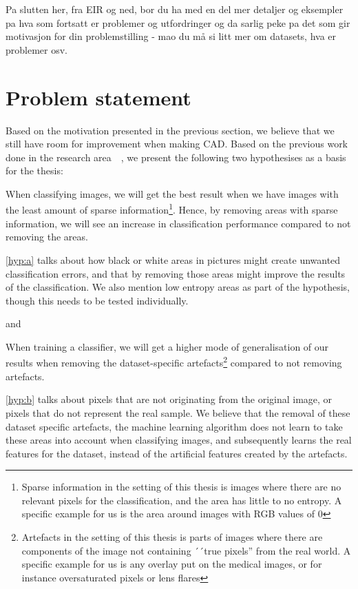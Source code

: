 \vspace{5px}
Pa slutten her, fra EIR og ned, bor du ha med en del mer detaljer og eksempler pa hva som fortsatt er problemer og utfordringer og da sarlig peke pa det som gir motivasjon for din problemstilling - mao du må si litt mer om datasets, hva er problemer osv.
\section{Problem statement}
\label{cha:problemstatement}
Based on the motivation presented in the previous section, we believe that we still have room for improvement when making CAD. Based on the previous work done in the research area~\cite{25956}~\cite{25953}, we present the following two hypothesises as a basis for the thesis:


\noindent
\begin{hyp} \label{hyp:a}
When classifying images, we will get the best result when we have images with the least amount of sparse information\footnote{Sparse information in the setting of this thesis is images where there are no relevant pixels for the classification, and the area has little to no entropy. A specific example for us is the area around images with RGB values of 0}. 
Hence, by removing areas with sparse information,
we will see an increase in classification performance compared to not removing the areas.
\end{hyp}

\noindent
\ref{hyp:a} talks about how black or white areas in pictures might create unwanted classification errors, and that by removing those areas might improve the results of the classification. We also mention low entropy areas as part of the hypothesis, though this needs to be tested individually.

\noindent
and

\noindent 
\begin{hyp} \label{hyp:b}
When training a classifier, we will get a higher mode of generalisation of our results when removing the dataset-specific artefacts\footnote{Artefacts in the setting of this thesis is parts of images where there are components of the image not containing ´´true pixels'' from the real world. A specific example for us is any overlay put on the medical images, or for instance oversaturated pixels or lens flares} compared to not removing artefacts.
\end{hyp}

\noindent
\ref{hyp:b} talks about pixels that are not originating from the original image, or pixels that do not represent the real sample. We believe that the removal of these dataset specific artefacts, the machine learning algorithm does not learn to take these areas into account when classifying images, and subsequently learns the real features for the dataset, instead of the artificial features created by the artefacts.


